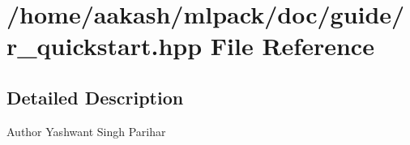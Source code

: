 \section{/home/aakash/mlpack/doc/guide/r\+\_\+quickstart.hpp File Reference}
\label{r__quickstart_8hpp}


\subsection{Detailed Description}
\begin{DoxyAuthor}{Author}
Yashwant Singh Parihar 
\end{DoxyAuthor}
